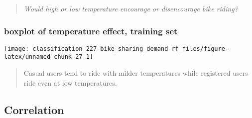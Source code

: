 \documentclass[]{book}
\newenvironment{Shaded}{\begin{snugshade}}{\end{snugshade}}
\newcommand{\DataTypeTok}[1]{\textcolor[rgb]{0.13,0.29,0.53}{#1}}
\newcommand{\DecValTok}[1]{\textcolor[rgb]{0.00,0.00,0.81}{#1}}
\newcommand{\KeywordTok}[1]{\textcolor[rgb]{0.13,0.29,0.53}{\textbf{#1}}}
\newcommand{\NormalTok}[1]{#1}
\newcommand{\OperatorTok}[1]{\textcolor[rgb]{0.81,0.36,0.00}{\textbf{#1}}}
\newcommand{\StringTok}[1]{\textcolor[rgb]{0.31,0.60,0.02}{#1}}
\begin{document}
\begin{quote}
\emph{Would high or low temperature encourage or disencourage bike riding?}
\end{quote}

\hypertarget{boxplot-of-temperature-effect-training-set}{%
\subsubsection{boxplot of temperature effect, training set}\label{boxplot-of-temperature-effect-training-set}}

\begin{Shaded}
\end{Shaded}

\begin{center}\texttt{[image: classification\_227-bike\_sharing\_demand-rf\_files/figure-latex/unnamed-chunk-27-1]} \end{center}

\begin{quote}
Casual users tend to ride with milder temperatures while registered users ride even at low temperatures.
\end{quote}

\hypertarget{correlation}{%
\subsection{Correlation}\label{correlation}}
\end{document}
